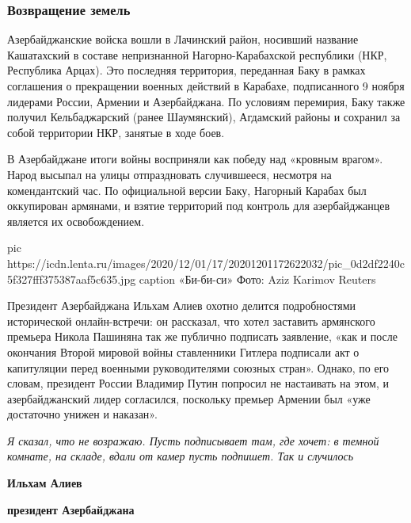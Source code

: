  
 
 
 
 
\subsubsection{Возвращение земель}
\label{sec:02_12_2020.news.ru.lenta_ru.1.karabah.vozvraschenie_zemel}

Азербайджанские войска вошли в Лачинский район, носивший название Кашатахский в
составе непризнанной Нагорно-Карабахской республики (НКР, Республика Арцах).
Это последняя территория, переданная Баку в рамках соглашения о прекращении
военных действий в Карабахе, подписанного 9 ноября лидерами России, Армении и
Азербайджана. По условиям перемирия, Баку также получил Кельбаджарский (ранее
Шаумянский), Агдамский районы и сохранил за собой территории НКР, занятые в
ходе боев.

В Азербайджане итоги войны восприняли как победу над «кровным врагом». Народ
высыпал на улицы отпраздновать случившееся, несмотря на комендантский час. По
официальной версии Баку, Нагорный Карабах был оккупирован армянами, и взятие
территорий под контроль для азербайджанцев является их освобождением.

\ifcmt
pic https://icdn.lenta.ru/images/2020/12/01/17/20201201172622032/pic_0d2df2240c5f327fff375387aaf5c635.jpg
caption «Би-би-си» Фото: Aziz Karimov Reuters 
\fi

Президент Азербайджана Ильхам Алиев охотно делится подробностями исторической
онлайн-встречи: он рассказал, что хотел заставить армянского премьера Никола
Пашиняна так же публично подписать заявление, «как и после окончания Второй
мировой войны ставленники Гитлера подписали акт о капитуляции перед военными
руководителями союзных стран». Однако, по его словам, президент России Владимир
Путин попросил не настаивать на этом, и азербайджанский лидер согласился,
поскольку премьер Армении был «уже достаточно унижен и наказан».

\begin{leftbar}
\emph{Я сказал, что не возражаю. Пусть подписывает там, где хочет: в темной комнате,
на складе, вдали от камер пусть подпишет. Так и случилось}\par
\textbf{Ильхам Алиев}\par
\textbf{президент Азербайджана}\par
\end{leftbar}

